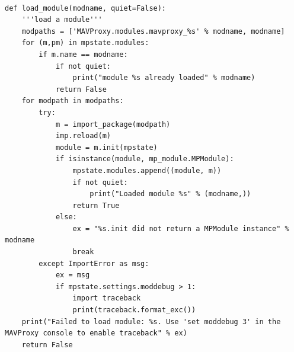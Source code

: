 \begin{lstlisting}[frame=single]

def load_module(modname, quiet=False):
    '''load a module'''
    modpaths = ['MAVProxy.modules.mavproxy_%s' % modname, modname]
    for (m,pm) in mpstate.modules:
        if m.name == modname:
            if not quiet:
                print("module %s already loaded" % modname)
            return False
    for modpath in modpaths:
        try:
            m = import_package(modpath)
            imp.reload(m)
            module = m.init(mpstate)
            if isinstance(module, mp_module.MPModule):
                mpstate.modules.append((module, m))
                if not quiet:
                    print("Loaded module %s" % (modname,))
                return True
            else:
                ex = "%s.init did not return a MPModule instance" % modname
                break
        except ImportError as msg:
            ex = msg
            if mpstate.settings.moddebug > 1:
                import traceback
                print(traceback.format_exc())
    print("Failed to load module: %s. Use 'set moddebug 3' in the MAVProxy console to enable traceback" % ex)
    return False
\end{lstlisting}

